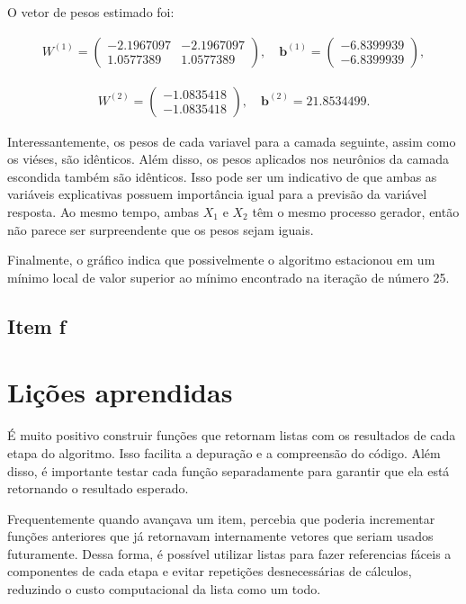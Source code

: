 \documentclass[
  a4paperpaper,
]{article}
\begin{document}
O vetor de pesos estimado foi:

\begin{align*}
W^{(1)} = \begin{pmatrix} -2.1967097 & -2.1967097 \\ 1.0577389 & 1.0577389 \end{pmatrix}, \quad 
%
\boldsymbol{b}^{(1)} = \begin{pmatrix} -6.8399939 \\ -6.8399939 \end{pmatrix},
\end{align*}

\begin{align*}
W^{(2)} = \begin{pmatrix} -1.0835418 \\ -1.0835418 \end{pmatrix}, \quad 
%
\boldsymbol{b}^{(2)} = 21.8534499.
\end{align*}

Interessantemente, os pesos de cada variavel para a camada seguinte,
assim como os viéses, são idênticos. Além disso, os pesos aplicados nos
neurônios da camada escondida também são idênticos. Isso pode ser um
indicativo de que ambas as variáveis explicativas possuem importância
igual para a previsão da variável resposta. Ao mesmo tempo, ambas
\(X_1\) e \(X_2\) têm o mesmo processo gerador, então não parece ser
surpreendente que os pesos sejam iguais.

Finalmente, o gráfico indica que possivelmente o algoritmo estacionou em
um mínimo local de valor superior ao mínimo encontrado na iteração de
número 25.

\subsection{Item f}\label{item-f}

\section{Lições aprendidas}\label{liuxe7uxf5es-aprendidas}

É muito positivo construir funções que retornam listas com os resultados
de cada etapa do algoritmo. Isso facilita a depuração e a compreensão do
código. Além disso, é importante testar cada função separadamente para
garantir que ela está retornando o resultado esperado.

Frequentemente quando avançava um item, percebia que poderia incrementar
funções anteriores que já retornavam internamente vetores que seriam
usados futuramente. Dessa forma, é possível utilizar listas para fazer
referencias fáceis a componentes de cada etapa e evitar repetições
desnecessárias de cálculos, reduzindo o custo computacional da lista
como um todo.
\end{document}
